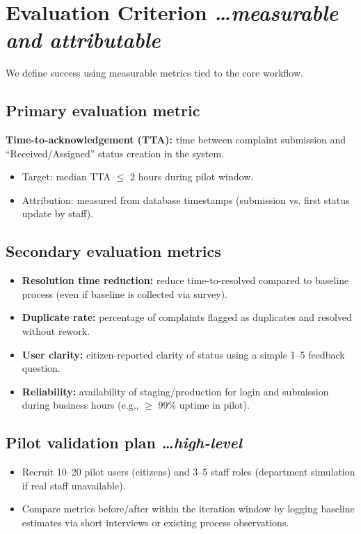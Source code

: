 \documentclass[11pt,a4paper]{article}
\newcommand{\BvrHint}[1]{%
  {\normalfont\normalsize\itshape\hfill #1}}
\begin{document}
\section{Evaluation Criterion %
\BvrHint{\ldots measurable and attributable}}
We define success using measurable metrics tied to the core workflow.

\subsection{Primary evaluation metric}
\textbf{Time-to-acknowledgement (TTA):} time between complaint submission and ``Received/Assigned'' status creation in the system.
\begin{itemize}[leftmargin=0.7cm]
    \item Target: median TTA $\le$ 2 hours during pilot window.
    \item Attribution: measured from database timestamps (submission vs. first status update by staff).
\end{itemize}

\subsection{Secondary evaluation metrics}
\begin{itemize}[leftmargin=0.7cm]
    \item \textbf{Resolution time reduction:} reduce time-to-resolved compared to baseline process (even if baseline is collected via survey).
    \item \textbf{Duplicate rate:} percentage of complaints flagged as duplicates and resolved without rework.
    \item \textbf{User clarity:} citizen-reported clarity of status using a simple 1--5 feedback question.
    \item \textbf{Reliability:} availability of staging/production for login and submission during business hours (e.g., $\ge$ 99\% uptime in pilot).
\end{itemize}

\subsection{Pilot validation plan %
\BvrHint{\ldots high-level}}
\begin{itemize}[leftmargin=0.7cm]
    \item Recruit 10--20 pilot users (citizens) and 3--5 staff roles (department simulation if real staff unavailable).
    \item Compare metrics before/after within the iteration window by logging baseline estimates via short interviews or existing process observations.
\end{itemize}
\end{document}
